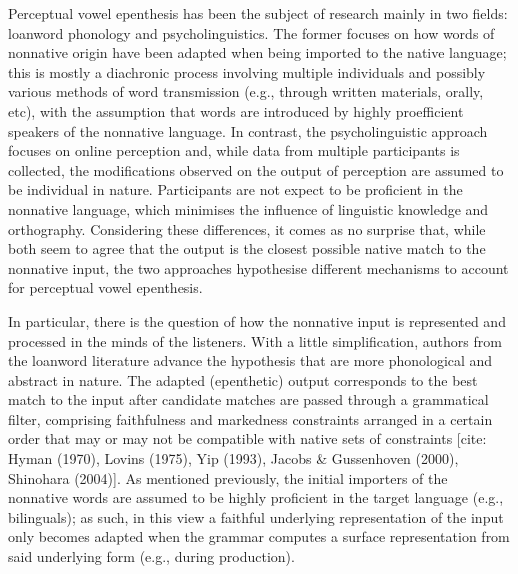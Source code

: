 Perceptual vowel epenthesis has been the subject of research mainly in two fields: loanword phonology and psycholinguistics. The former focuses on how words of nonnative origin have been adapted when being imported to the native language; this is mostly a diachronic process involving multiple individuals and possibly various methods of word transmission (e.g., through written materials, orally, etc), with the assumption that words are introduced by highly proefficient speakers of the nonnative language. In contrast, the psycholinguistic approach focuses on online perception and, while data from multiple participants is collected, the modifications observed on the output of perception are assumed to be individual in nature. Participants are not expect to be proficient in the nonnative language, which minimises the influence of linguistic knowledge and orthography. Considering these differences, it comes as no surprise that, while both seem to agree that the output is the closest possible native match to the nonnative input, the two approaches hypothesise different mechanisms to account for perceptual vowel epenthesis. 

In particular, there is the question of how the nonnative input is represented and processed in the minds of the listeners. With a little simplification, authors from the loanword literature advance the hypothesis that are more phonological and abstract in nature. The adapted (epenthetic) output corresponds to the best match to the input after candidate matches are passed through a grammatical filter, comprising faithfulness and markedness constraints arranged in a certain order that may or may not be compatible with native sets of constraints [cite: Hyman (1970), Lovins (1975), Yip (1993), Jacobs \& Gussenhoven (2000), Shinohara (2004)]. As mentioned previously, the initial importers of the nonnative words are assumed to be highly proficient in the target language (e.g., bilinguals); as such, in this view a faithful underlying representation of the input only becomes adapted when the grammar computes a surface representation from said underlying form (e.g., during production).      


